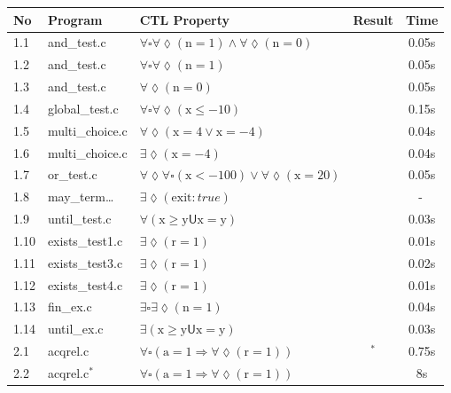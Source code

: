 \documentclass[11pt,a4paper,titlepage]{article}
\theoremstyle{definition}
\newcommand{\inevitably}{\ensuremath{\forall}}
\newcommand{\possibly}{\ensuremath{\exists}}
\newcommand{\globally}{\ensuremath{\square}}
\newcommand{\finally}{\ensuremath{\lozenge}}
\newcommand{\until}{\ensuremath{\mathrel{\mathsf{U}}}}
\newcommand{\cmark}{\textcolor{green!75!black}{\ding{51}$^{\ }$}} %
\newcommand{\nmark}{-$^{\ }$} %
\newcommand{\smark}{\textcolor{green!75!black}{\ding{51}$^*$}} %
\newcommand{\xmark}{\textcolor{red}{\ding{55}$^{\ }$}} %
\begin{document}
\begin{table}
\begin{center}
\scriptsize

\begin{tabular}{lllcc}
\textbf{No} & \textbf{Program} & \textbf{CTL Property} & \textbf{Result} & \textbf{Time} \\
\hline
1.1 & and\_test.c & $\inevitably\globally\inevitably\finally(\text{n} = 1) \land \inevitably\finally(\text{n} = 0)$ & \cmark & 0.05s \\
1.2 & and\_test.c & $\inevitably\globally\inevitably\finally(\text{n} = 1)$ & \cmark & 0.05s \\
1.3 & and\_test.c & $\inevitably\finally(\text{n} = 0)$ & \cmark & 0.05s \\
1.4 & global\_test.c & $\inevitably\globally\inevitably\finally(\text{x} \leq -10)$ & \cmark & 0.15s \\
1.5 & multi\_choice.c & $\inevitably\finally(\text{x} = 4 \lor \text{x} = -4)$ & \cmark & 0.04s \\
1.6 & multi\_choice.c & $\possibly\finally(\text{x} = -4)$ & \cmark & 0.04s \\
1.7 & or\_test.c & $\inevitably\finally\inevitably\globally(\text{x} < -100) \lor \inevitably\finally(\text{x} = 20)$  & \cmark & 0.05s \\
1.8 & may\_term\dots & $\possibly\finally(\text{exit}: true)$ & \xmark & \nmark \\
1.9 & until\_test.c & $\inevitably(\text{x} \geq \text{y} \until \text{x} = \text{y})$ & \cmark & 0.03s \\
1.10 & exists\_test1.c & $\possibly\finally(\text{r} = 1)$ & \cmark & 0.01s \\
1.11 & exists\_test3.c & $\possibly\finally(\text{r} = 1)$ & \cmark & 0.02s \\
1.12 & exists\_test4.c & $\possibly\finally(\text{r} = 1)$ & \cmark & 0.01s \\
1.13 & fin\_ex.c & $\possibly\globally\possibly\finally(\text{n} = 1)$ & \cmark & 0.04s \\
1.14 & until\_ex.c & $\possibly(\text{x} \geq \text{y} \until \text{x} = \text{y})$ & \cmark & 0.03s \\
\hline
2.1 & acqrel.c & $\inevitably\globally(\text{a} = 1 \Rightarrow \inevitably\finally(\text{r} = 1))$ & \smark & 0.75s \\
2.2 & acqrel.c$^*$ & $\inevitably\globally(\text{a} = 1 \Rightarrow \inevitably\finally(\text{r} = 1))$ & \cmark & 8s \\

\end{tabular}
\end{center}
\end{table}
\end{document}
